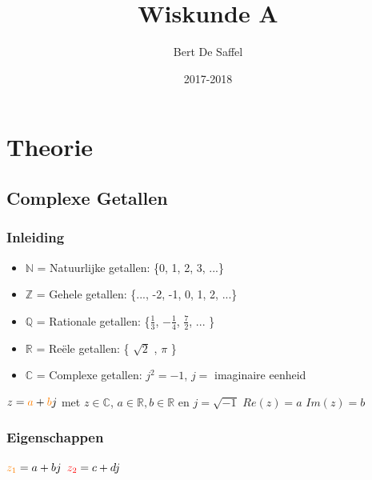 \documentclass[12pt]{report}
\title{Wiskunde A}
\author{Bert De Saffel}
\date{2017-2018}
\newcommand{\mathimportant}[2] {\textbf{\color{#2}$#1$}}
\begin{document}
\maketitle
\tableofcontents

\part{Theorie}
\chapter{Complexe Getallen}
\section{Inleiding}
\begin{itemize}
 \item $\mathbb{N}$ = Natuurlijke getallen: \{0, 1, 2, 3, ...\}
 \item $\mathbb{Z}$ = Gehele getallen: \{..., -2, -1, 0, 1, 2, ...\}
 \item $\mathbb{Q}$ = Rationale getallen: \{$\frac{1}{3}$, $-\frac{1}{4}$, $\frac{7}{2}$, ... \}
 \item $\mathbb{R}$ = Reële getallen: \{ $\sqrt{2}$ , $\pi$ \}
 \item $\mathbb{C}$ = Complexe getallen: $j^2 = -1$, $j = $ imaginaire eenheid
\end{itemize}

  $z = \mathimportant{a}{orange} + \mathimportant{b}{orange}j$ met $z \in \mathbb{C}$, $a \in \mathbb{R}, b \in \mathbb{R}$ en $j = \sqrt{-1}$
  \newline
  $Re(z) = a$
  \newline
  $Im(z) = b$

\section{Eigenschappen}
$\mathimportant{z_1}{orange} = a + bj$
\newline
$\mathimportant{z_2}{red} = c + dj$
 
\end{document}
